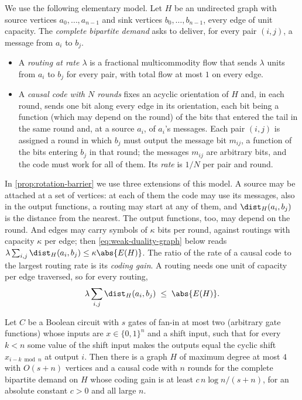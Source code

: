 We use the following elementary model. Let $H$ be an undirected graph with source vertices
$a_0,\dots,a_{n-1}$ and sink vertices $b_0,\dots,b_{n-1}$, every edge of unit capacity. The
\emph{complete bipartite demand} asks to deliver, for every pair $(i,j)$, a message from $a_i$ to $b_j$.
\begin{itemize}[leftmargin=2em]
\item A \emph{routing at rate $\lambda$} is a fractional multicommodity flow that sends $\lambda$ units
from $a_i$ to $b_j$ for every pair, with total flow at most $1$ on every edge.
\item A \emph{causal code with $N$ rounds} fixes an acyclic orientation of $H$ and, in each round, sends
one bit along every edge in its orientation, each bit being a function (which may depend on the round) of the
bits that entered the tail in the same round and, at a source $a_i$, of $a_i$'s messages. Each pair $(i,j)$ is assigned a
round in which $b_j$ must output the message bit $m_{ij}$, a function of the bits entering $b_j$ in
that round; the messages $m_{ij}$ are arbitrary bits, and the code must work for all of them. Its
\emph{rate} is $1/N$ per pair and round.
\end{itemize}
In \cref{prop:rotation-barrier} we use three extensions of this model. A source may be attached at a set of
vertices: at each of them the code may use its messages, also in the output functions, a routing may start at any
of them, and $\dist_H(a_i,b_j)$ is the distance from the nearest. The output functions, too, may depend on the round. And edges
may carry symbols of $\kappa$ bits per round, against routings with capacity $\kappa$ per edge; then
\eqref{eq:weak-duality-graph} below reads $\lambda\sum_{i,j}\dist_H(a_i,b_j)\le\kappa\abs{E(H)}$.
The ratio of the rate of a causal code to the largest routing rate is its \emph{coding gain}. A routing
needs one unit of capacity per edge traversed, so for every routing,
\begin{equation}\label{eq:weak-duality-graph}
  \lambda\sum_{i,j}\dist_H(a_i,b_j)\;\le\;\abs{E(H)} .
\end{equation}

\begin{proposition}\label{prop:circuit-barrier}
\notformalized
Let $C$ be a Boolean circuit with $s$ gates of fan-in at most two (arbitrary gate functions) whose
inputs are $x\in\{0,1\}^n$ and a shift input, such that for every $k<n$ some value of the shift input
makes the outputs equal the cyclic shift $x_{i-k\bmod n}$ at output $i$. Then there is a graph $H$ of
maximum degree at most $4$ with $O(s+n)$ vertices and a causal code with $n$ rounds for the complete
bipartite demand on $H$ whose coding gain is at least $c\,n\log n/(s+n)$, for an absolute constant
$c>0$ and all large $n$.
\end{proposition}

